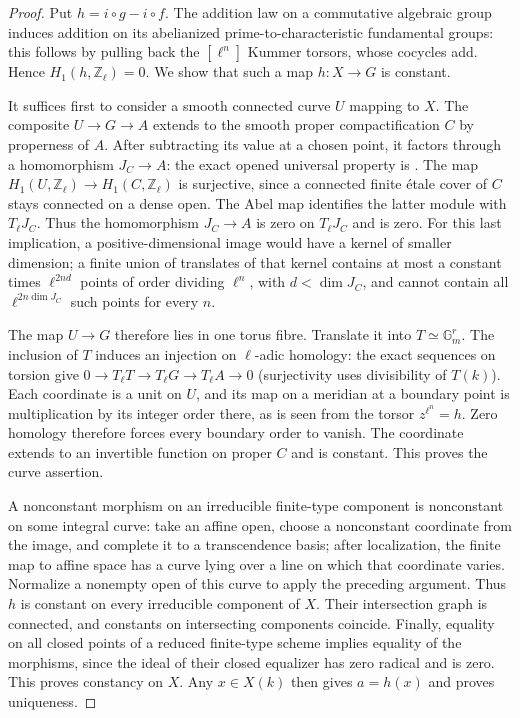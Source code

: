 \begin{proof}
Put $h=i\circ g-i\circ f$. The addition law on a commutative algebraic
group induces addition on its abelianized prime-to-characteristic
fundamental groups: this follows by pulling back the $[\ell^n]$
Kummer torsors, whose cocycles add. Hence $H_1(h,\mathbb Z_\ell)=0$.
We show that such a map $h:X\to G$ is constant.

It suffices first to consider a smooth connected curve $U$ mapping
to $X$. The composite $U\to G\to A$ extends to the smooth proper
compactification $C$ by properness of $A$. After subtracting its
value at a chosen point, it factors through a homomorphism
$J_C\to A$: the exact opened universal property is
\cite[III, Proposition 6.1]{AB_MilneAV}. The map
$H_1(U,\mathbb Z_\ell)\to H_1(C,\mathbb Z_\ell)$ is surjective,
since a connected finite \'etale cover of $C$ stays connected on a
dense open. The Abel map identifies the latter module with
$T_\ell J_C$\cite[III, Proposition 9.1 and Corollary 9.6]{AB_MilneAV}.
Thus the homomorphism $J_C\to A$ is zero on $T_\ell J_C$ and is zero.
For this last implication, a positive-dimensional image would have a
kernel of smaller dimension; a finite union of translates of that
kernel contains at most a constant times $\ell^{2nd}$ points of
order dividing $\ell^n$, with $d<\dim J_C$, and cannot contain all
$\ell^{2n\dim J_C}$ such points for every $n$.

The map $U\to G$ therefore lies in one torus fibre. Translate it into
$T\simeq\mathbb G_m^r$. The inclusion of $T$ induces an injection
on $\ell$-adic homology: the exact sequences on torsion give
$0\to T_\ell T\to T_\ell G\to T_\ell A\to0$ (surjectivity uses
divisibility of $T(k)$). Each coordinate is a unit on $U$, and its
map on a meridian at a boundary point is multiplication by its
integer order there, as is seen from the torsor $z^{\ell^n}=h$.
Zero homology therefore forces every boundary order to vanish.
The coordinate extends to an invertible function on proper $C$ and
is constant. This proves the curve assertion.

A nonconstant morphism on an irreducible finite-type component is
nonconstant on some integral curve: take an affine open, choose a
nonconstant coordinate from the image, and complete it to a
transcendence basis; after localization, the finite map to affine
space has a curve lying over a line on which that coordinate varies.
Normalize a nonempty open of this curve to apply the preceding
argument. Thus $h$ is constant on every irreducible component of
$X$. Their intersection graph is connected, and constants on
intersecting components coincide. Finally, equality on all closed
points of a reduced finite-type scheme implies equality of the
morphisms, since the ideal of their closed equalizer has zero
radical and is zero. This proves constancy on $X$. Any $x\in X(k)$
then gives $a=h(x)$ and proves uniqueness.
\end{proof}

